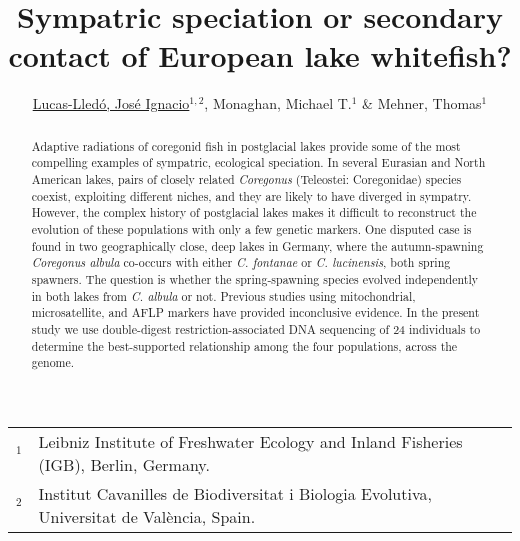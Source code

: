 \documentclass[a4paper,12pt]{article}
\author{\small \underline{Lucas-Lled\'o, Jos\'e Ignacio}$^{1,2}$, Monaghan, Michael T.$^1$ \& Mehner, Thomas$^1$}
\title{Sympatric speciation or secondary contact of European lake whitefish?}
\date{}
\begin{document}
\maketitle
\begin{center}
{\scriptsize
\begin{tabular}{ll}
$^1$&Leibniz Institute of Freshwater Ecology and Inland Fisheries (IGB), Berlin, Germany.\\
$^2$&Institut Cavanilles de Biodiversitat i Biologia Evolutiva, Universitat de València, Spain.\\
\end{tabular}
}
\end{center}
\begin{abstract}
Adaptive radiations of coregonid fish in postglacial lakes provide some of the most compelling examples of sympatric, ecological speciation. In several Eurasian and North American lakes, pairs of closely related \emph{Coregonus} (Teleostei: Coregonidae) species coexist, exploiting different niches, and they are likely to have diverged in sympatry. However, the complex history of postglacial lakes makes it difficult to reconstruct the evolution of these populations with only a few genetic markers. One disputed case is found in two geographically close, deep lakes in Germany, where the autumn-spawning \emph{Coregonus albula} co-occurs with either \emph{C. fontanae} or \emph{C. lucinensis}, both spring spawners. The question is whether the spring-spawning species evolved independently in both lakes from \emph{C. albula} or not. Previous studies using mitochondrial, microsatellite, and AFLP markers have provided inconclusive evidence. In the present study we use double-digest restriction-associated DNA sequencing of 24 individuals to determine the best-supported relationship among the four populations, across the genome.
\end{abstract}
\end{document}
